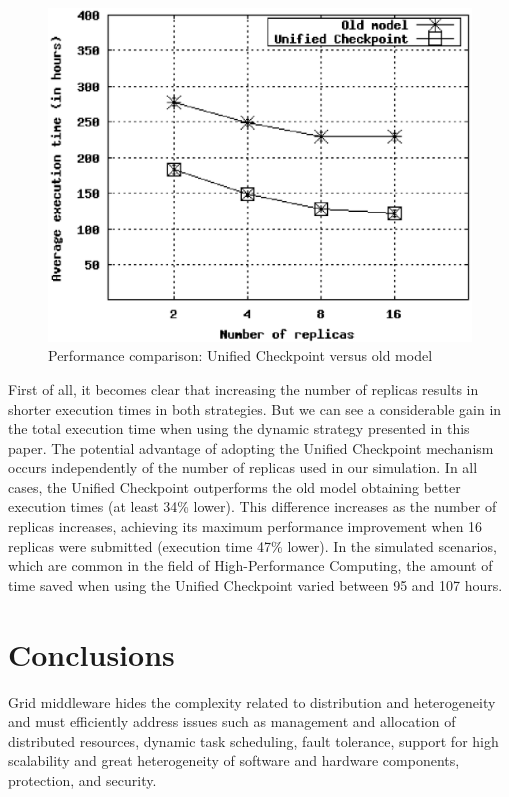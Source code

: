 \documentclass{sig-alternate}
\begin{document}
\begin{figure}[th]
\centering \includegraphics[width=1.1\columnwidth]{49-55_scenario.eps}
\caption{Performance comparison: Unified Checkpoint versus old model}
\label{fig:adapt-mag}
\end{figure}

First of all, it becomes clear that increasing the number of replicas results
in shorter execution times in both strategies. But we can see a considerable
gain in the total execution time when using the dynamic strategy presented in
this paper. The potential advantage of adopting the Unified Checkpoint
mechanism occurs independently of the number of replicas used in our
simulation. In all cases, the Unified Checkpoint outperforms the old model
obtaining better execution times (at least 34\% lower). This difference
increases as the number of replicas increases, achieving its maximum
performance improvement when 16 replicas were submitted (execution time 47\%
lower).  In the simulated scenarios, which are common in the field of
High-Performance Computing, the amount of time saved when using the Unified
Checkpoint varied between 95 and 107 hours.


\section{Conclusions}

Grid middleware hides the complexity related to distribution and
heterogeneity and must efficiently address issues such as management
and allocation of distributed resources, dynamic task scheduling, fault
tolerance, support for high scalability and great heterogeneity of software and
hardware components, protection, and security. 
\end{document}
